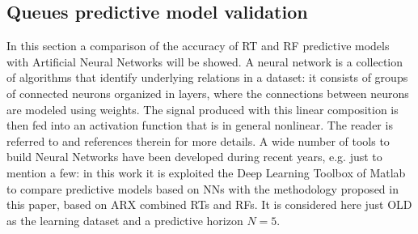 \subsection{Queues predictive model validation}

In this section a comparison of the accuracy of RT and RF predictive models with Artificial Neural Networks will be showed. A neural network is a collection of algorithms that identify underlying relations in a dataset: it consists of groups of connected neurons organized in layers, where the connections between neurons are modeled using weights. The signal produced with this linear composition is then fed into an activation function that is in general nonlinear. The reader is referred to \cite{NNstateOfART} and references therein for more details. A wide number of tools to build Neural Networks have been developed during recent years, e.g. \cite{tensorflow2015,chollet2015keras,openNN} just to mention a few: in this work it is exploited the Deep Learning Toolbox of Matlab to compare predictive models based on NNs with the methodology proposed in this paper, based on ARX combined RTs and RFs. It is considered here just OLD as the learning dataset and a predictive horizon $N=5$.

